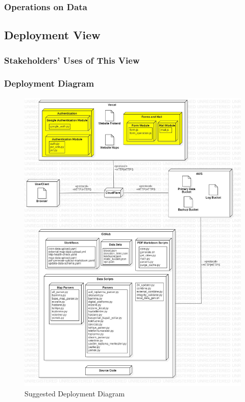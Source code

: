 \subsubsection{Operations on Data}

\subsection{Deployment View}

\subsubsection{Stakeholders' Uses of This View}

\subsubsection{Deployment Diagram}

\begin{figure}[H]
  \centering
  \includegraphics[width=\linewidth]{img/deployment-diagram-s5.jpg}
  \caption{Suggested Deployment Diagram}
\end{figure}

